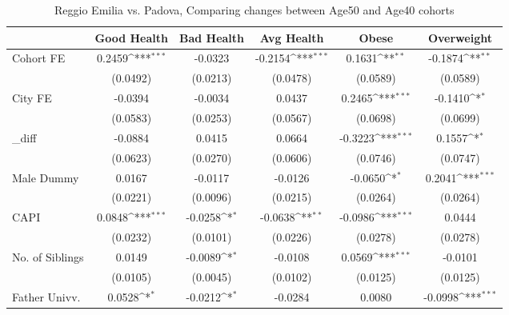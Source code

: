 \begin{table}[htbp]\centering
\def\sym#1{\ifmmode^{#1}\else\(^{#1}\)\fi}
\caption{Reggio Emilia vs. Padova, Comparing changes between Age50 and Age40 cohorts}
\begin{tabular}{l*{5}{c}}
\toprule
            &\multicolumn{1}{c}{Good Health}&\multicolumn{1}{c}{Bad Health}&\multicolumn{1}{c}{Avg Health}&\multicolumn{1}{c}{Obese}&\multicolumn{1}{c}{Overweight}\\
\midrule
Cohort FE   &      0.2459\sym{***}&     -0.0323         &     -0.2154\sym{***}&      0.1631\sym{**} &     -0.1874\sym{**} \\
            &    (0.0492)         &    (0.0213)         &    (0.0478)         &    (0.0589)         &    (0.0589)         \\
\addlinespace
City FE     &     -0.0394         &     -0.0034         &      0.0437         &      0.2465\sym{***}&     -0.1410\sym{*}  \\
            &    (0.0583)         &    (0.0253)         &    (0.0567)         &    (0.0698)         &    (0.0699)         \\
\addlinespace
\_diff       &     -0.0884         &      0.0415         &      0.0664         &     -0.3223\sym{***}&      0.1557\sym{*}  \\
            &    (0.0623)         &    (0.0270)         &    (0.0606)         &    (0.0746)         &    (0.0747)         \\
\addlinespace
Male Dummy  &      0.0167         &     -0.0117         &     -0.0126         &     -0.0650\sym{*}  &      0.2041\sym{***}\\
            &    (0.0221)         &    (0.0096)         &    (0.0215)         &    (0.0264)         &    (0.0264)         \\
\addlinespace
CAPI        &      0.0848\sym{***}&     -0.0258\sym{*}  &     -0.0638\sym{**} &     -0.0986\sym{***}&      0.0444         \\
            &    (0.0232)         &    (0.0101)         &    (0.0226)         &    (0.0278)         &    (0.0278)         \\
\addlinespace
No. of Siblings&      0.0149         &     -0.0089\sym{*}  &     -0.0108         &      0.0569\sym{***}&     -0.0101         \\
            &    (0.0105)         &    (0.0045)         &    (0.0102)         &    (0.0125)         &    (0.0125)         \\
\addlinespace
Father Univv.&      0.0528\sym{*}  &     -0.0212\sym{*}  &     -0.0284         &      0.0080         &     -0.0998\sym{***}\\

\end{tabular}
\end{table}
